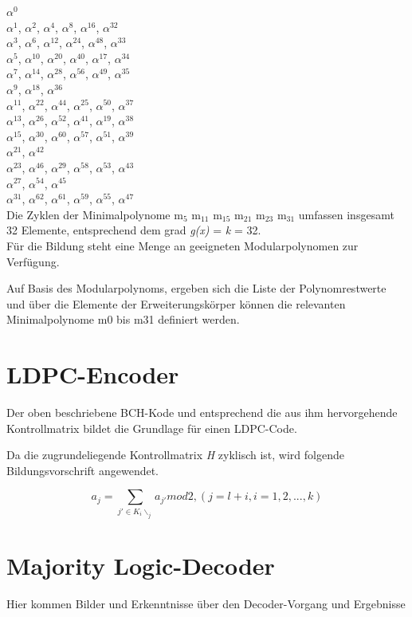 \documentclass[11pt,a4paper]{article}
\begin{document}
$\alpha$$^{0}$ \\
$\alpha$$^{1}$, $\alpha$$^{2}$, $\alpha$$^{4}$, $\alpha$$^{8}$, $\alpha$$^{16}$, $\alpha$$^{32}$ \\
$\alpha$$^{3}$, $\alpha$$^{6}$, $\alpha$$^{12}$, $\alpha$$^{24}$, $\alpha$$^{48}$, $\alpha$$^{33}$ \\
$\alpha$$^{5}$, $\alpha$$^{10}$, $\alpha$$^{20}$, $\alpha$$^{40}$, $\alpha$$^{17}$, $\alpha$$^{34}$ \\
$\alpha$$^{7}$, $\alpha$$^{14}$, $\alpha$$^{28}$, $\alpha$$^{56}$, $\alpha$$^{49}$, $\alpha$$^{35}$ \\
$\alpha$$^{9}$, $\alpha$$^{18}$, $\alpha$$^{36}$ \\ $\alpha$$^{11}$, $\alpha$$^{22}$, $\alpha$$^{44}$,
$\alpha$$^{25}$, $\alpha$$^{50}$, $\alpha$$^{37}$ \\
$\alpha$$^{13}$, $\alpha$$^{26}$, $\alpha$$^{52}$, $\alpha$$^{41}$, $\alpha$$^{19}$, $\alpha$$^{38}$ \\
$\alpha$$^{15}$, $\alpha$$^{30}$, $\alpha$$^{60}$, $\alpha$$^{57}$, $\alpha$$^{51}$, $\alpha$$^{39}$ \\
$\alpha$$^{21}$, $\alpha$$^{42}$ \\
$\alpha$$^{23}$, $\alpha$$^{46}$, $\alpha$$^{29}$, $\alpha$$^{58}$, $\alpha$$^{53}$, $\alpha$$^{43}$ \\
$\alpha$$^{27}$, $\alpha$$^{54}$, $\alpha$$^{45}$ \\
$\alpha$$^{31}$, $\alpha$$^{62}$, $\alpha$$^{61}$, $\alpha$$^{59}$, $\alpha$$^{55}$, $\alpha$$^{47}$ \\

Die Zyklen der Minimalpolynome m$_{5}$ m$_{11}$ m$_{15}$ m$_{21}$ m$_{23}$ m$_{31}$ umfassen insgesamt 32 Elemente, entsprechend dem grad \textit{g(x)} = \textit{k} = 32. \\

Für die Bildung steht eine Menge an geeigneten Modularpolynomen zur Verfügung.

Auf Basis des Modularpolynoms, ergeben sich die Liste der Polynomrestwerte und über die Elemente der Erweiterungskörper können die relevanten  Minimalpolynome m0 bis m31 definiert werden.




\section{LDPC-Encoder}
Der oben beschriebene BCH-Kode und entsprechend die aus ihm hervorgehende Kontrollmatrix bildet die Grundlage für einen LDPC-Code.

Da die zugrundeliegende Kontrollmatrix \textit{H} zyklisch ist, wird folgende Bildungsvorschrift angewendet.

\[ a_{j} = \sum_{j′∈K_{i}\backslash_{j}} a_{j′}  mod  2 , (j = l + i, i = 1, 2, ..., k)  \]

\section{Majority Logic-Decoder}
Hier kommen Bilder und Erkenntnisse über den Decoder-Vorgang und Ergebnisse
\end{document}
